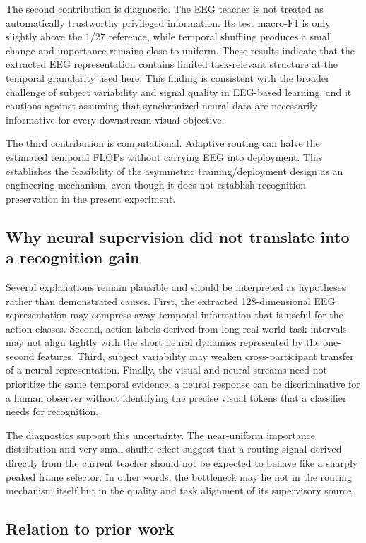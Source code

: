 \documentclass[runningheads]{llncs}
\begin{document}
The second contribution is diagnostic. The EEG teacher is not treated as automatically trustworthy privileged information. Its test macro-F1 is only slightly above the $1/27$ reference, while temporal shuffling produces a small change and importance remains close to uniform. These results indicate that the extracted EEG representation contains limited task-relevant structure at the temporal granularity used here. This finding is consistent with the broader challenge of subject variability and signal quality in EEG-based learning, and it cautions against assuming that synchronized neural data are necessarily informative for every downstream visual objective.

The third contribution is computational. Adaptive routing can halve the estimated temporal FLOPs without carrying EEG into deployment. This establishes the feasibility of the asymmetric training/deployment design as an engineering mechanism, even though it does not establish recognition preservation in the present experiment.

\subsection{Why neural supervision did not translate into a recognition gain}

Several explanations remain plausible and should be interpreted as hypotheses rather than demonstrated causes. First, the extracted 128-dimensional EEG representation may compress away temporal information that is useful for the action classes. Second, action labels derived from long real-world task intervals may not align tightly with the short neural dynamics represented by the one-second features. Third, subject variability may weaken cross-participant transfer of a neural representation. Finally, the visual and neural streams need not prioritize the same temporal evidence: a neural response can be discriminative for a human observer without identifying the precise visual tokens that a classifier needs for recognition.

The diagnostics support this uncertainty. The near-uniform importance distribution and very small shuffle effect suggest that a routing signal derived directly from the current teacher should not be expected to behave like a sharply peaked frame selector. In other words, the bottleneck may lie not in the routing mechanism itself but in the quality and task alignment of its supervisory source.

\subsection{Relation to prior work}
\end{document}
